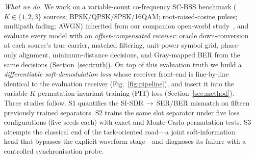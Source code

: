 \documentclass[review,12pt]{elsarticle}
\begin{document}
\emph{What we do.} We work on a variable-count co-frequency SC-BSS
benchmark ($K \in \{1,2,3\}$ sources; BPSK/QPSK/8PSK/16QAM;
root-raised-cosine pulses; multipath fading; AWGN) inherited from our
companion open-world study~\cite{nong2026openworld}, and evaluate every
model with an \emph{offset-compensated receiver}: oracle down-conversion
at each source's true carrier, matched filtering, unit-power symbol
grid, phase-only alignment, minimum-distance decisions, and Gray-mapped
BER from the same decisions (Section~\ref{sec:truth}). On top of this
evaluation truth we build a \emph{differentiable soft-demodulation
loss} whose receiver front-end is line-by-line identical to the
evaluation receiver (Fig.~\ref{fig:pipeline}), and insert it into the variable-$K$
permutation-invariant training (PIT) loss (Section~\ref{sec:method}).
Three studies follow. S1 quantifies the SI-SDR$\,\to\,$SER/BER mismatch
on fifteen previously trained separators. S2 trains the same slot
separator under five loss configurations (five seeds each) with exact
and Monte-Carlo permutation tests. S3 attempts the classical end of the
task-oriented road---a joint soft-information head that bypasses the
explicit waveform stage---and diagnoses its failure with a controlled
synchronisation probe.
\end{document}
